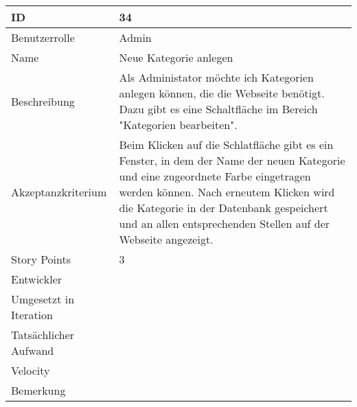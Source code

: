 \begin{tabularx}{\textwidth}{|p{}|X|}
	\hline
	ID & 34\\
	\hline
	Benutzerrolle & Admin\\
	\hline
	Name & Neue Kategorie anlegen\\
	\hline
	Beschreibung & Als Administator möchte ich Kategorien anlegen können, die die Webseite benötigt. Dazu gibt es eine Schaltfläche im Bereich "Kategorien bearbeiten".\\
	\hline
	Akzeptanzkriterium & Beim Klicken auf die Schlatfläche gibt es ein Fenster, in dem der Name der neuen Kategorie und eine zugeordnete Farbe eingetragen werden können. Nach erneutem Klicken wird die Kategorie in der Datenbank gespeichert und an allen entsprechenden Stellen auf der Webseite angezeigt.\\
	\hline
	Story Points & 3 \\
	\hline
	Entwickler & \\
	\hline
	Umgesetzt in Iteration & \\
	\hline
	Tatsächlicher Aufwand & \\
	\hline
	Velocity & \\
	\hline
	Bemerkung & \\
	\hline
\end{tabularx}
\vspace{20pt}
